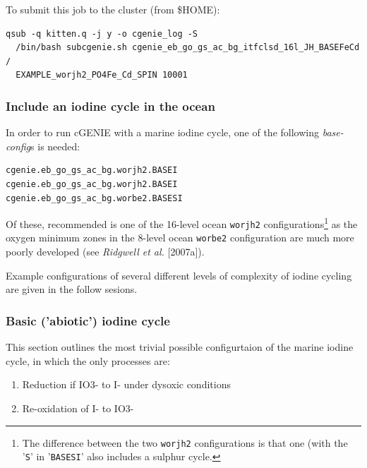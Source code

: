 \documentclass[11pt,fleqn]{book} %
\begin{document}
To submit this job to the cluster (from \$HOME):
\vspace{-5.1mm}\begin{verbatim}
qsub -q kitten.q -j y -o cgenie_log -S
  /bin/bash subcgenie.sh cgenie_eb_go_gs_ac_bg_itfclsd_16l_JH_BASEFeCd /
  EXAMPLE_worjh2_PO4Fe_Cd_SPIN 10001
\end{verbatim}\vspace{-5.1mm}

%
\subsubsection{Include an iodine cycle in the ocean}
\vspace{1mm}

In order to run cGENIE with a marine iodine cycle, one of the following \textit{base-config}s is needed:
\vspace{-1mm}\begin{verbatim}
cgenie.eb_go_gs_ac_bg.worjh2.BASEI
cgenie.eb_go_gs_ac_bg.worjh2.BASEI
cgenie.eb_go_gs_ac_bg.worbe2.BASESI
\end{verbatim}\vspace{-1mm}
Of these, recommended is one of the 16-level ocean \texttt{worjh2} configurations\footnote{The difference between the two \texttt{worjh2} configurations is that one (with the '\texttt{S}' in '\texttt{BASESI}' also includes a sulphur cycle.} as the oxygen minimum zones in the 8-level ocean \texttt{worbe2} configuration are much more poorly developed (see \textit{Ridgwell et al.} [2007a]).

Example configurations of several different levels of complexity of iodine cycling are given in the follow sesions. 

%
\subsubsection{Basic ('abiotic') iodine cycle}
\vspace{1mm}

This section outlines the most trivial possible configurtaion of the marine iodine cycle, in which the only processes are:
\begin{enumerate}[noitemsep]
\vspace{1mm}
\item Reduction if IO3- to I- under dysoxic conditions
\vspace{1mm}
\item Re-oxidation of I- to IO3-
\end{enumerate}
\vspace{1mm}
\end{document}
